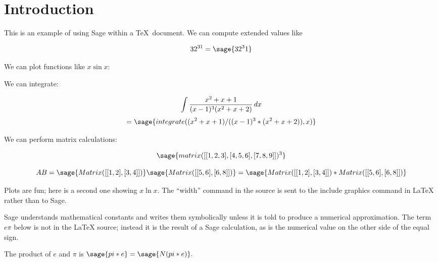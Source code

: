 \documentclass[11pt, oneside]{amsart}
\begin{document}
\section{Introduction}

This is an example of using Sage within a \TeX\ document. We can compute extended values like 

	$$32^{31} = \sage{32^31}$$
	

We can plot functions like $x \sin x$:

 
 We can integrate:
 
 $$\int {{x^2 + x + 1} \over {(x - 1)^3 (x^2 + x + 2)}}\,dx$$
 $$=  \sage{integrate( (x^2 + x + 1) / ((x - 1)^3 * (x^2 + x + 2)), x )}$$
 
 We can perform matrix calculations:
 
$$\sage{matrix([[1, 2, 3], [4, 5, 6], [7, 8, 9]])^3}$$

$$AB=  \sage{Matrix([[1, 2], [3, 4]])} \sage{Matrix([[5, 6], [6, 8]])} = \sage{Matrix([[1, 2], [3, 4]]) * Matrix([[5, 6], [6, 8]])}$$

Plots are fun; here is a second one showing $x \ln x$. The ``width'' command in the source is sent to the include graphics command in LaTeX rather than to Sage.


Sage understands mathematical constants and writes them symbolically unless it is told to produce a numerical approximation. The term $e \pi$ below is not in the LaTeX source; instead it is the result of a Sage calculation, as is the numerical value on the other side of the equal sign.

The product of $e$ and $\pi$ is $\sage{pi * e} = \sage{N(pi * e)}.$
\end{document}
